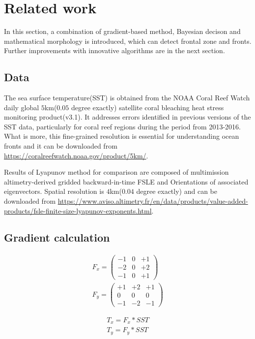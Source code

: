 \section{Related work}
In this section, a combination of gradient-based method, Bayesian decison and mathematical morphology is introduced, which can detect frontal zone and fronts. Further improvements with innovative algorithms are in the next section.

\subsection{Data}
The sea surface temperature(SST) is obtained from the NOAA Coral Reef Watch daily global $5$km($0.05$ degree exactly) satellite coral bleaching heat stress monitoring product(v3.1). It addresses errors identified in previous versions of the SST data, particularly for coral reef regions during the period from 2013-2016. What is more, this fine-grained resolution is essential for understanding ocean fronts and it can be downloaded from \url{https://coralreefwatch.noaa.gov/product/5km/}. 

Results of Lyapunov method for comparison are composed of multimission altimetry-derived gridded backward-in-time FSLE and Orientations of associated eigenvectors\cite{Hernandez-2011}. Spatial resolution is $4$km($0.04$ degree exactly) and can be downloaded from \url{https://www.aviso.altimetry.fr/en/data/products/value-added-products/fsle-finite-size-lyapunov-exponents.html}.

\subsection{Gradient calculation}
\begin{equation}\label{eq:kernel}
	\begin{gathered}
		F_{x}=\begin{pmatrix}-1&0&+1\\-2&0&+2\\-1&0&+1\end{pmatrix}\\
		F_{y}=\begin{pmatrix}+1&+2&+1\\0&0&0\\-1&-2&-1\end{pmatrix}
	\end{gathered}
\end{equation}

\begin{equation}
	\begin{gathered}
		T_x=F_x*SST\\
		T_y=F_y*SST
	\end{gathered}
\end{equation}

